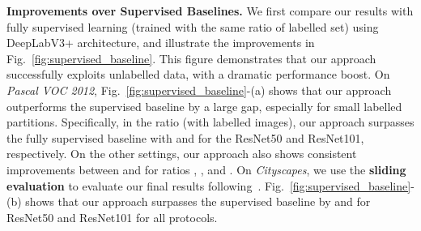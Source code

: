 \documentclass[10pt,twocolumn,letterpaper]{article}
\begin{document}
\textbf{Improvements over Supervised Baselines.} We first compare our results with fully supervised learning (trained with the same ratio of labelled set) using DeepLabV3+ architecture, and illustrate the improvements in  Fig.~\ref{fig:supervised_baseline}. This figure demonstrates that our approach successfully exploits unlabelled data, with a dramatic performance boost. On \textit{Pascal VOC 2012}, Fig.~\ref{fig:supervised_baseline}-(a) shows that our approach outperforms the supervised baseline by a large gap, especially for small labelled partitions. Specifically, in the  ratio (with  labelled images), our approach surpasses the fully supervised baseline with  and  for the ResNet50 and ResNet101, respectively. On the other settings, our approach also shows consistent improvements 
between  and  for ratios , , and .
On \textit{Cityscapes}, we use the \textbf{sliding evaluation}
to evaluate our final results following~\cite{chen2021semi}. Fig.~\ref{fig:supervised_baseline}-(b) shows that our approach surpasses the supervised baseline by  and  
for ResNet50 and ResNet101 for all protocols. 
\end{document}
